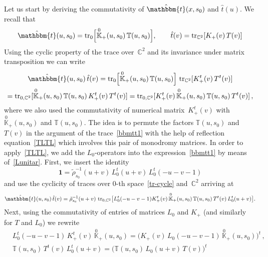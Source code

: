 \documentclass[a4paper,11pt]{article}
\newcommand{\tr}{\mathop{\rm tr}\nolimits}
\numberwithin{equation}{section}
\begin{document}
Let us start by deriving the commutativity of $\hat{\mathbbm{t}}(x,s_0)$ and $\hat{t}(u)$. 
We recall that
\begin {align*}
	\hat{\mathbbm{t}}(u,s_0) = \tr_0\Bigl[\overset{0}{\mathbb{K}}_+(u,s_0)\,\mathbb{T}(u,s_0)\Bigr], \qquad
	\hat{t}(v) = \tr_{\mathbb{C}^2}[K_+(v)\,T(v)]
\end{align*}
Using the cyclic property of the trace over~$\mathbb{C}^2$ and its invariance under matrix transposition we can write
\begin{multline} \label{bbmtt1}
	\hat{\mathbbm{t}}(u,s_0)\,\hat{t}(v) = \tr_0\Bigl[\overset{0}{\mathbb{K}}_+(u,s_0)\,\mathbb{T}(u,s_0)\Bigr]\,\tr_{\mathbb{C}^2}[K_+^t(v)\,T^t(v)] \\
	=
	\tr_{0,\mathbb{C}^2}[\overset{0}{\mathbb{K}}_+(u,s_0)\,\mathbb{T}(u,s_0)\,K_+^t(v)\,T^t(v)]
	= \tr_{0,\mathbb{C}^2}[K_+^t(v)\,\overset{0}{\mathbb{K}}_+(u,s_0)\,\mathbb{T}(u,s_0)\,T^t(v)] \,,
\end{multline}
where we also used the commutativity of numerical matrix~$K_+^t(v)$ with~$\overset{0}{\mathbb{K}}_+(u,s_0)$ and $\mathbb{T}(u,s_0)$.
The idea is to permute the factors $\mathbb{T}(u,s_0)$ and $T(v)$ in the argument of the trace~\eqref{bbmtt1} with the help of reflection equation~\eqref{TLTL} which involves this pair of monodromy matrices.
In order to apply~\eqref{TLTL}, we add the $L_0$-operators into the expression~\eqref{bbmtt1} by means of~\eqref{Lunitar}.
First, we insert the identity
\begin{equation} \label{ident1}
	\bm{1} = \tilde{\rho}_{s_0}^{-1}(u+v)\,L_0^t(u+v)\,L_0^t(-u-v-1)
\end{equation}
and use the cyclicity of traces over $0$-th space~\eqref{tr-cycle} and~$\mathbb{C}^2$ arriving at
\begin{align*}
	\hat{\mathbbm{t}}(u,s_0)\,\hat{t}(v) = \tilde{\rho}_{s_0}^{-1}(u+v)\,
	\tr_{0,\mathbb{C}^2}\bigl[L_0^t(-u-v-1) K_+^t(v)\,\overset{0}{\mathbb{K}}_+(u,s_0)\,\mathbb{T}(u,s_0)\,T^t(v)\, L_0^t(u+v)\bigr] .
\end{align*}
Next, using the commutativity of entries of matrices $L_0$ and $K_+$ (and similarly for $T$ and $L_0$) we rewrite
\begin{align*}
	& \nonumber
	L_0^t(-u-v-1)\,K_+^t(v)\,\overset{0}{\mathbb{K}}_+(u,s_0) =
	\bigl(K_+(v)\,L_0(-u-v-1)\,\overset{0}{\mathbb{K}}_+(u,s_0)\bigr)^t \,, \\
	& \nonumber
	\mathbb{T}(u,s_0)\,T^t(v)\,L_0^t(u+v) =
	\bigl(\mathbb{T}(u,s_0)\,L_0(u+v)\,T(v)\bigr)^t
\end{align*}
\end{document}
